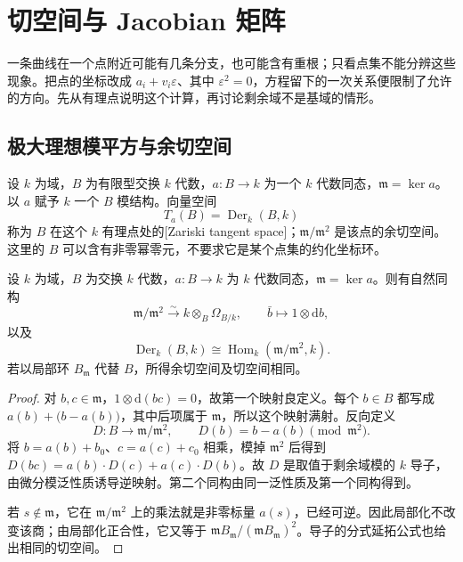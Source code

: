 
\section{切空间与 Jacobian 矩阵}
\label{b3:sec:1403}

一条曲线在一个点附近可能有几条分支，也可能含有重根；只看点集不能分辨这些现象。把点的坐标改成 \(a_i+v_i\varepsilon\)、其中 \(\varepsilon^2=0\)，方程留下的一次关系便限制了允许的方向。先从有理点说明这个计算，再讨论剩余域不是基域的情形。


\subsection{极大理想模平方与余切空间}
\label{b3:subsec:1403:01}

\begin{definition}\label{b3:def:zariski-tangent-space}
	设 \(k\) 为域，\(B\) 为有限型交换 \(k\) 代数，\(a:B\to k\) 为一个 \(k\) 代数同态，\(\mathfrak m=\ker a\)。以 \(a\) 赋予 \(k\) 一个 \(B\) 模结构。向量空间
	\[
		T_a(B)=\operatorname{Der}_k(B,k)
	\]
	称为 \(B\) 在这个 \(k\) 有理点处的[Zariski tangent space]；\(\mathfrak m/\mathfrak m^2\) 是该点的余切空间。这里的 \(B\) 可以含有非零幂零元，不要求它是某个点集的约化坐标环。
\end{definition}

\begin{proposition}\label{b3:prop:tangent-cotangent-rational}
	设 \(k\) 为域，\(B\) 为交换 \(k\) 代数，\(a:B\to k\) 为 \(k\) 代数同态，\(\mathfrak m=\ker a\)。则有自然同构
	\[
		\mathfrak m/\mathfrak m^2\xrightarrow{\sim} k\otimes_B\Omega_{B/k},\qquad \bar b\longmapsto1\otimes \mathrm{d}b,
	\]
	以及
	\[
		\operatorname{Der}_k(B,k) \cong\operatorname{Hom}_k(\mathfrak m/\mathfrak m^2,k).
	\]
	若以局部环 \(B_{\mathfrak m}\) 代替 \(B\)，所得余切空间及切空间相同。
\end{proposition}
\begin{proof}
	对 \(b,c\in\mathfrak m\)，\(1\otimes \mathrm{d}(bc)=0\)，故第一个映射良定义。每个 \(b\in B\) 都写成 \(a(b)+\bigl(b-a(b)\bigr)\)，其中后项属于 \(\mathfrak m\)，所以这个映射满射。反向定义
	\[
		D:B\longrightarrow\mathfrak m/\mathfrak m^2, \qquad D(b)=b-a(b)\pmod{\mathfrak m^2}.
	\]
	将 \(b=a(b)+b_0\)、\(c=a(c)+c_0\) 相乘，模掉 \(\mathfrak m^2\) 后得到 \(D(bc)=a(b)\cdot D(c)+a(c)\cdot D(b)\)。故 \(D\) 是取值于剩余域模的 \(k\) 导子，由微分模泛性质诱导逆映射。第二个同构由同一泛性质及第一个同构得到。

	若 \(s\notin\mathfrak m\)，它在 \(\mathfrak m/\mathfrak m^2\) 上的乘法就是非零标量 \(a(s)\)，已经可逆。因此局部化不改变该商；由局部化正合性，它又等于 \(\mathfrak mB_{\mathfrak m}/(\mathfrak mB_{\mathfrak m})^2\)。导子的分式延拓公式也给出相同的切空间。
\end{proof}

